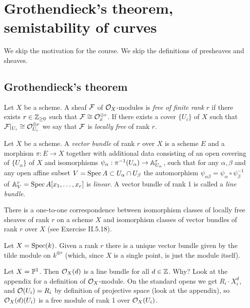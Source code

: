 \chapter{Grothendieck's theorem, semistability of curves}
We skip the motivation for the course.
We skip the definitions of presheaves and sheaves.
\section{Grothendieck's theorem}
\begin{definition}
	Let $X$ be a scheme. A sheaf $\mathcal{F}$ of $\mathcal{O}_X$-modules is \emph{free of finite rank} $r$ if there exists $r \in \mathbb{Z}_{\geq 0}$ such that $\mathcal{F} \cong \mathcal{O}_x^{\oplus r}$. If there exists a cover $\{U_i\}$ of $X$ such that $\mathcal{F}|_{U_i} \cong \mathcal{O}_{U_i}^{\oplus r}$ we say that $\mathcal{F}$ is \emph{locally free} of rank $r$.
\end{definition}

\begin{definition}
	Let $X$ be a scheme. A \emph{vector bundle} of rank $r$ over $X$ is a scheme $E$ and a morphism $\pi: E \to X$ together with additional data consisting of an open covering of $\{U_\alpha\}$ of $X$ 
	and isomorphisms $\psi_\alpha: \pi^{-1}(U_\alpha) \to \mathbb{A}^r_{U_\alpha}$, such that for any $\alpha, \beta$ and any open affine subset $V = \operatorname{Spec} A \subset U_\alpha \cap U_\beta$ the automorphism $\psi_{\alpha\beta} = \psi_\alpha \circ \psi^{-1}_\beta$ of $\mathbb{A}^r_{V} = \operatorname{Spec} A [x_1, \ldots, x_r]$ is \emph{linear}. A vector bundle of rank 1 is called a \emph{line bundle}.
\end{definition}

\begin{rmk}
	There is a one-to-one correspondence between isomorphism classes of locally free sheaves of rank $r$ on a scheme $X$ and isomorphism classes of vector bundles of rank $r$ over $X$ (see \cite{hartshorne2013algebraic} Exercise II.5.18).
\end{rmk}

\begin{example}
	Let $X = \operatorname{Spec}(k)$. Given a rank $r$ there is a unique vector bundle given by the tilde module on $k^{\oplus r}$ (which, since $X$ is a single point, is just the module itself).  
\end{example}

\begin{example}
	Let $X = \mathbb{P}^1$. Then $\mathcal{O}_X(d)$ is a line bundle for all $d \in \mathbb{Z}$. Why? Look at the appendix for a definition of $\mathcal{O}_X$-module. On the standard opens we get ${R_i \cdot X_i^d}$, and $\mathcal{O}(U_i) = R_i$ by definition of projective space (look at the appendix), so $\mathcal{O}_X(d)(U_i)$ is a free module of rank 1 over $\mathcal{O}_X(U_i)$. 
\end{example}

